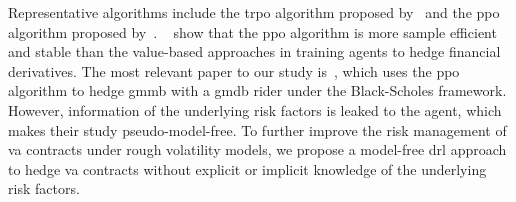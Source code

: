Representative algorithms include the \gls{trpo} algorithm proposed by~\cite{schulman2015trust} and the \gls{ppo} algorithm proposed by~\cite{schulman2017proximal}.
~\cite{du2020deep} show that the \gls{ppo} algorithm is more sample efficient and stable than the value-based approaches in training agents to hedge financial derivatives.
The most relevant paper to our study is~\cite{chong2023pseudo}, which uses the \gls{ppo} algorithm to hedge \gls{gmmb} with a \gls{gmdb} rider under the Black-Scholes framework.
However, information of the underlying risk factors is leaked to the agent, which makes their study pseudo-model-free.
To further improve the risk management of \gls{va} contracts under rough volatility models, we propose a model-free \gls{drl} approach to hedge \gls{va} contracts without explicit or implicit knowledge of the underlying risk factors.

